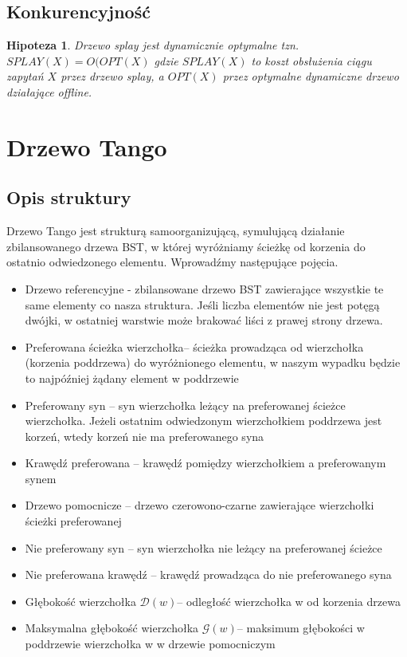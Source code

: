 \documentclass[declaration,shortabstract]{iithesis}
\theoremstyle{remark}
\theoremstyle{plain}
\theoremstyle{plain}
\newtheorem{hypothesis}[definition]{Hipoteza}
\theoremstyle{plain}
\begin{document}
\section{Konkurencyjność}
\begin{hypothesis}
Drzewo splay jest dynamicznie optymalne tzn. \(SPLAY(X) = O(OPT(X)\) gdzie \(SPLAY(X)\) to koszt obsłużenia ciągu zapytań \(X\) przez drzewo splay, a \(OPT(X)\) przez optymalne dynamiczne drzewo działające offline.
\end{hypothesis}



\chapter{ Drzewo Tango}
\section{Opis struktury}
Drzewo Tango jest strukturą samoorganizującą, symulującą działanie zbilansowanego drzewa BST, w której wyróżniamy ścieżkę od korzenia do ostatnio odwiedzonego elementu.  Wprowadźmy następujące pojęcia. 
\begin{itemize}
\item{Drzewo referencyjne - zbilansowane drzewo BST zawierające wszystkie te same elementy co nasza struktura. Jeśli liczba elementów nie jest potęgą dwójki, w ostatniej warstwie może brakować liści z prawej strony drzewa.}
\item{Preferowana ścieżka wierzchołka– ścieżka prowadząca od wierzchołka (korzenia poddrzewa) do wyróżnionego elementu, w naszym wypadku będzie to najpóźniej  żądany element w poddrzewie}
\item{Preferowany syn – syn wierzchołka leżący na preferowanej ścieżce wierzchołka. Jeżeli ostatnim odwiedzonym wierzchołkiem poddrzewa jest korzeń, wtedy korzeń nie ma preferowanego syna}
\item{Krawędź preferowana – krawędź pomiędzy wierzchołkiem a preferowanym synem}
\item{Drzewo pomocnicze -- drzewo czerowono-czarne zawierające wierzchołki ścieżki preferowanej}
\item{Nie preferowany syn – syn wierzchołka nie leżący na preferowanej ścieżce}
\item{Nie preferowana krawędź – krawędź prowadząca do nie preferowanego syna}
\item{Głębokość wierzchołka \(\mathcal{D}(w)\)-- odległość wierzchołka w od korzenia drzewa}
\item{Maksymalna głębokość wierzchołka \(\mathcal{G}(w)\)-- maksimum głębokości w poddrzewie wierzchołka w w drzewie pomocniczym}
\end{itemize}
\end{document}
